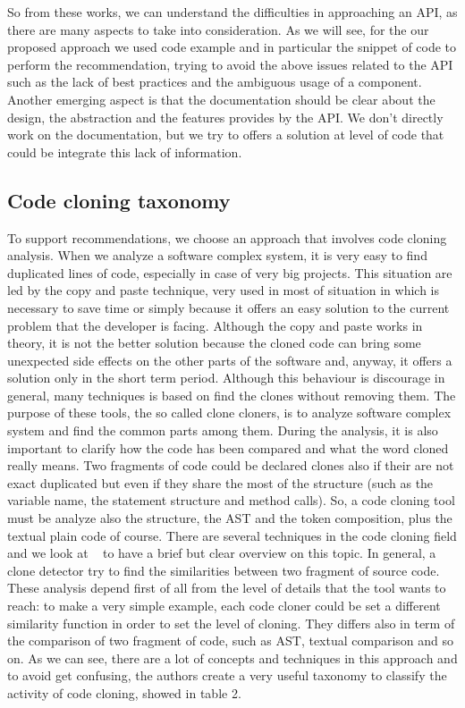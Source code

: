 So from these works, we can understand the difficulties in approaching an API, as there are many aspects to take into consideration. As we will see, for the our proposed approach we used code example and in particular the snippet of code to perform the recommendation, trying to avoid the above issues related to the API such as the lack of best practices and the ambiguous usage of a component. Another emerging aspect is that the documentation should be clear about the design, the abstraction and the features provides by the API. We don't directly work on the documentation, but we try to offers a solution at level of code that could be integrate this lack of information.



\subsection{Code cloning taxonomy}
To support recommendations, we choose an approach that involves code cloning analysis. When we analyze a software complex system, it is very easy to find duplicated lines of code, especially in case of very big projects. This situation are led by the copy and paste technique, very used in most of situation in which is necessary to save time or simply because it offers an easy solution to the current problem that the developer is facing. Although the copy and paste works in theory, it is not the better solution because the cloned code can bring some unexpected side effects on the other parts of the software and, anyway, it offers a solution only in the short term period. Although this behaviour is discourage in general, many techniques is based on find the clones without removing them. The purpose of these tools, the so called clone cloners, is to analyze software complex system and find the common parts among them. During the analysis, it is also important to clarify how the code has been compared and what the word cloned really means. Two fragments of code could be declared clones also if their are not exact duplicated but even if they share the most of the structure (such as the variable name, the statement structure and method calls). So, a code cloning tool must be analyze also the structure, the AST and the token composition, plus the textual plain code of course. There are several techniques in the code cloning field and we look at ~\cite{chanchal_k._roy_comparison_2009} to have a brief but clear overview on this topic. In general, a clone detector try to find the similarities between two fragment of source code. These analysis depend first of all from the level of details that the tool wants to reach: to make a very simple example, each code cloner could be set a different similarity function in order to set the level of cloning. They differs also in term of the comparison of two fragment of code, such as AST, textual comparison and so on. As we can see, there are a lot of concepts and techniques in this approach and to avoid get confusing, the authors create a very useful taxonomy to classify the activity of code cloning, showed in table 2.

